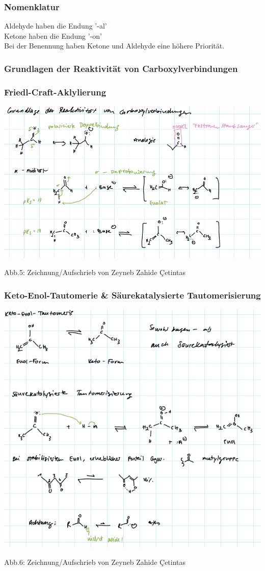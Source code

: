 \documentclass[a4paper, fleqn]{article}
\def\Cc{Ç}
\begin{document}
\subsubsection{Nomenklatur}
Aldehyde haben die Endung '-al'\\
Ketone haben die Endung '-on'\\
Bei der Benennung haben Ketone und Aldehyde eine h\"ohere Priorit\"at.
\subsubsection{Grundlagen der Reaktivit\"at von Carboxylverbindungen}
\subsubsection{Friedl-Craft-Aklylierung}
\includegraphics[width=0.9\pdfpagewidth]{knogg.PNG}
\begin{center}
  Abb.5: Zeichnung/Aufschrieb von Zeyneb Zahide \Cc etintas
\end{center}
\subsubsection{Keto-Enol-Tautomerie \& S\"aurekatalysierte Tautomerisierung}
\includegraphics[width=0.9\pdfpagewidth]{ninjaball.PNG}
\begin{center}
  Abb.6: Zeichnung/Aufschrieb von Zeyneb Zahide \Cc etintas
\end{center}
\end{document}

